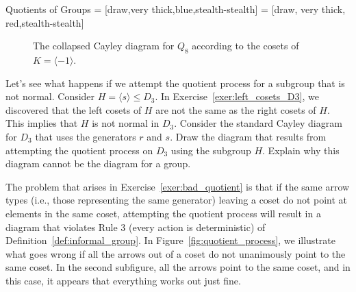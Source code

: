 \begin{section}{Quotients of Groups}
 = [draw,very thick,blue,stealth-stealth]
 = [draw, very thick, red,stealth-stealth]

\begin{figure}[!ht]
\centering
{}
\caption{The collapsed Cayley diagram for $Q_8$ according to the cosets of $K=\langle -1\rangle$.}
\label{fig:Q8_quotient}
\end{figure}

\begin{exercise}\label{exer:bad_quotient}
Let's see what happens if we attempt the quotient process for a subgroup that is not normal.  Consider $H=\langle s\rangle \leq D_3$.  In Exercise~\ref{exer:left_cosets_D3}, we discovered that the left cosets of $H$ are not the same as the right cosets of $H$.  This implies that $H$ is not normal in $D_3$.  Consider the standard Cayley diagram for $D_3$ that uses the generators $r$ and $s$.  Draw the diagram that results from attempting the quotient process on $D_3$ using the subgroup $H$.  Explain why this diagram cannot be the diagram for a group.
\end{exercise}

The problem that arises in Exercise~\ref{exer:bad_quotient} is that if the same arrow types (i.e., those representing the same generator) leaving a coset do not point at elements in the same coset, attempting the quotient process will result in a diagram that violates Rule 3 (every action is deterministic) of Definition~\ref{def:informal_group}.  In Figure~\ref{fig:quotient_process}, we illustrate what goes wrong if all the arrows out of a coset do not unanimously point to the same coset.  In the second subfigure, all the arrows point to the same coset, and in this case, it appears that everything works out just fine.


\end{section}
